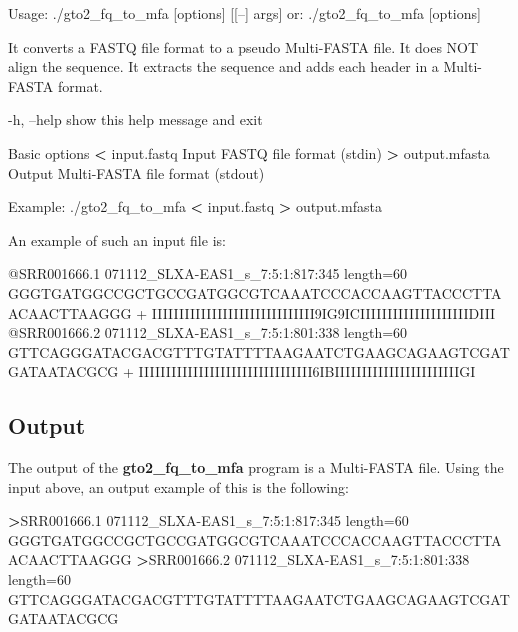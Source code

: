 \documentclass[11pt,]{krantz}
\newenvironment{Shaded}{\begin{snugshade}}{\end{snugshade}}
\newcommand{\OperatorTok}[1]{\textcolor[rgb]{0.43,0.43,0.43}{\textbf{#1}}}
\newcommand{\ExtensionTok}[1]{#1}
\newcommand{\NormalTok}[1]{#1}
\begin{document}
\begin{Shaded}
\begin{Highlighting}[]
\ExtensionTok{Usage}\NormalTok{: ./gto2_fq_to_mfa [options] [[--] args]}
   \ExtensionTok{or}\NormalTok{: ./gto2_fq_to_mfa [options]}

\ExtensionTok{It}\NormalTok{ converts a FASTQ file format to a pseudo Multi-FASTA file.}
\ExtensionTok{It}\NormalTok{ does NOT align the sequence.}
\ExtensionTok{It}\NormalTok{ extracts the sequence and adds each header in a Multi-FASTA format.}

    \ExtensionTok{-h}\NormalTok{, --help            show this help message and exit}

\ExtensionTok{Basic}\NormalTok{ options}
    \OperatorTok{<} \ExtensionTok{input.fastq}\NormalTok{         Input FASTQ file format (stdin)}
    \OperatorTok{>} \ExtensionTok{output.mfasta}\NormalTok{       Output Multi-FASTA file format (stdout)}

\ExtensionTok{Example}\NormalTok{: ./gto2_fq_to_mfa }\OperatorTok{<}\NormalTok{ input.fastq }\OperatorTok{>}\NormalTok{ output.mfasta}
\end{Highlighting}
\end{Shaded}

An example of such an input file is:

\begin{Shaded}
\begin{Highlighting}[]
\ExtensionTok{@SRR001666.1}\NormalTok{ 071112_SLXA-EAS1_s_7:5:1:817:345 length=60}
\ExtensionTok{GGGTGATGGCCGCTGCCGATGGCGTCAAATCCCACCAAGTTACCCTTAACAACTTAAGGG}
\ExtensionTok{+}
\ExtensionTok{IIIIIIIIIIIIIIIIIIIIIIIIIIIIII9IG9ICIIIIIIIIIIIIIIIIIIIIDIII}
\ExtensionTok{@SRR001666.2}\NormalTok{ 071112_SLXA-EAS1_s_7:5:1:801:338 length=60}
\ExtensionTok{GTTCAGGGATACGACGTTTGTATTTTAAGAATCTGAAGCAGAAGTCGATGATAATACGCG}
\ExtensionTok{+}
\ExtensionTok{IIIIIIIIIIIIIIIIIIIIIIIIIIIIIIII6IBIIIIIIIIIIIIIIIIIIIIIIIGI}
\end{Highlighting}
\end{Shaded}

\subsection*{Output}\label{output-1}


The output of the \textbf{gto2\_fq\_to\_mfa} program is a Multi-FASTA
file. Using the input above, an output example of this is the following:

\begin{Shaded}
\begin{Highlighting}[]
\OperatorTok{>}\ExtensionTok{SRR001666.1}\NormalTok{ 071112_SLXA-EAS1_s_7:5:1:817:345 length=60}
\ExtensionTok{GGGTGATGGCCGCTGCCGATGGCGTCAAATCCCACCAAGTTACCCTTAACAACTTAAGGG}
\OperatorTok{>}\ExtensionTok{SRR001666.2}\NormalTok{ 071112_SLXA-EAS1_s_7:5:1:801:338 length=60}
\ExtensionTok{GTTCAGGGATACGACGTTTGTATTTTAAGAATCTGAAGCAGAAGTCGATGATAATACGCG}
\end{Highlighting}
\end{Shaded}
\end{document}
